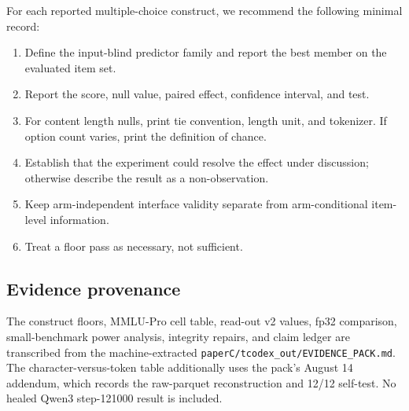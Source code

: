 For each reported multiple-choice construct, we recommend the following minimal record:
\begin{enumerate}[leftmargin=*]
    \item Define the input-blind predictor family and report the best member on the evaluated item set.
    \item Report the score, null value, paired effect, confidence interval, and test.
    \item For content length nulls, print tie convention, length unit, and tokenizer. If option count varies, print the definition of chance.
    \item Establish that the experiment could resolve the effect under discussion; otherwise describe the result as a non-observation.
    \item Keep arm-independent interface validity separate from arm-conditional item-level information.
    \item Treat a floor pass as necessary, not sufficient.
\end{enumerate}

\subsection{Evidence provenance}

The construct floors, MMLU-Pro cell table, read-out v2 values, fp32 comparison, small-benchmark power analysis, integrity repairs, and claim ledger are transcribed from the machine-extracted \texttt{paperC/tcodex\_out/EVIDENCE\_PACK.md}. The character-versus-token table additionally uses the pack's August 14 addendum, which records the raw-parquet reconstruction and 12/12 self-test. No healed Qwen3 step-121000 result is included.
